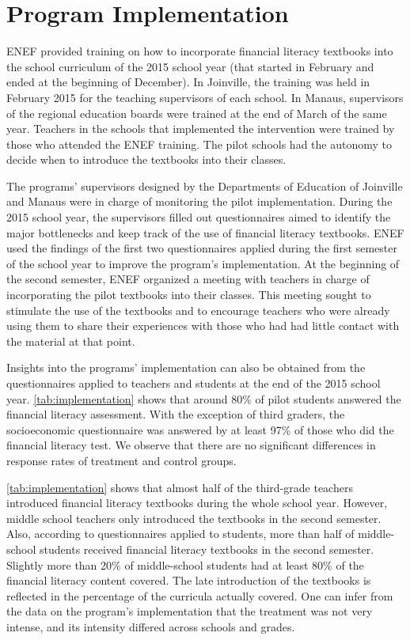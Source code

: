 \section{Program Implementation} \label{sec:implementation}

ENEF provided training on how to incorporate financial literacy textbooks into the school curriculum of the 2015 school year (that started in February and ended at the beginning of December). In Joinville, the training was held in February 2015 for the teaching supervisors of each school. In Manaus, supervisors of the regional education boards were trained at the end of March of the same year. Teachers in the schools that implemented the intervention were trained by those who attended the ENEF training. The pilot schools had the autonomy to decide when to introduce the textbooks into their classes. 

The programs' supervisors designed by the Departments of Education of Joinville and Manaus were in charge of monitoring the pilot implementation. During the 2015 school year, the supervisors filled out questionnaires aimed to identify the major bottlenecks and keep track of the use of financial literacy textbooks. ENEF used the findings of the first two questionnaires applied during the first semester of the school year to improve the program's implementation. At the beginning of the second semester, ENEF organized a meeting with teachers in charge of incorporating the pilot textbooks into their classes. This meeting sought to stimulate the use of the textbooks and to encourage teachers who were already using them to share their experiences with those who had had little contact with the material at that point.

Insights into the programs' implementation can also be obtained from the questionnaires applied to teachers and students at the end of the 2015 school year. \autoref{tab:implementation} shows that around 80\% of pilot students answered the financial literacy assessment. With the exception of third graders, the socioeconomic questionnaire was answered by at least 97\% of those who did the financial literacy test. We observe that there are no significant differences in response rates of treatment and control groups. 

\autoref{tab:implementation} shows that almost half of the third-grade teachers introduced financial literacy textbooks during the whole school year. However, middle school teachers only introduced the textbooks in the second semester. Also, according to questionnaires applied to students, more than half of middle-school students received financial literacy textbooks in the second semester.  Slightly more than 20\% of middle-school students had at least 80\% of the financial literacy content covered. The late introduction of the textbooks is reflected in the percentage of the curricula actually covered. One can infer from the data on the program's implementation that the treatment was not very intense, and its intensity differed across schools and grades.  
